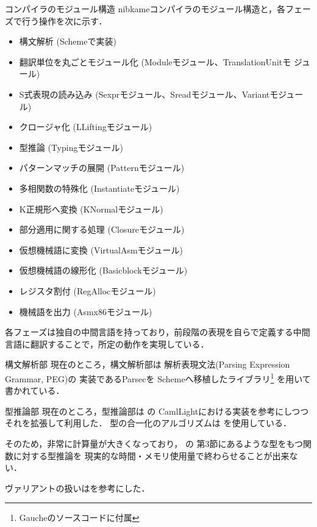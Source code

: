 \documentclass[a4paper,titlepage,report]{jsbook}
\begin{document}
\begin{resbonsiblesection}{コンパイラのモジュール構造}{\kobori}
nibkameコンパイラのモジュール構造と，各フェーズで行う操作を次に示す．

\begin{itemize}
 \item 構文解析 (Schemeで実装)
 \item 翻訳単位を丸ごとモジュール化 (Moduleモジュール、TranslationUnitモ
       ジュール)
 \item S式表現の読み込み (Sexprモジュール、Sreadモジュール、Variantモジュー
       ル)
 \item クロージャ化 (LLiftingモジュール)
 \item 型推論 (Typingモジュール)
 \item パターンマッチの展開 (Patternモジュール)
 \item 多相関数の特殊化 (Instantiateモジュール)
 \item K正規形へ変換 (KNormalモジュール)
 \item 部分適用に関する処理 (Closureモジュール)
 \item 仮想機械語に変換 (VirtualAsmモジュール)
 \item 仮想機械語の線形化 (Basicblockモジュール)
 \item レジスタ割付 (RegAllocモジュール)
 \item 機械語を出力 (Asmx86モジュール)
\end{itemize}

各フェーズは独自の中間言語を持っており，前段階の表現を自らで定義する中間
言語に翻訳することで，所定の動作を実現している．
\end{resbonsiblesection}

\begin{resbonsiblesection}{構文解析部}{\sakamoto}\label{sc:impl-parsing}
現在のところ，構文解析部は
解析表現文法(Parsing Expression Grammar, PEG)\cite{Ford:2004:PEG:982962.964011}の
実装であるParsec\cite{Hutton96monadicparser}を
Schemeへ移植したライブラリ\footnote{Gaucheのソースコードに付属}
を用いて書かれている．
\end{resbonsiblesection}

\begin{resbonsiblesection}{型推論部}{\sakamoto}\label{sc:impl-type-inference}
現在のところ，型推論部は
\algorithmW\cite{Milner1978348}\cite{Damas:1982:PTF:582153.582176}の
CamlLightにおける実装\cite{Lee:1998:PFL:291891.291892}を参考にしつつ
それを拡張して利用した．
型の合一化のアルゴリズムは
\algorithmU\cite{DBLP:books/el/RV01/BaaderS01}
を使用している．

そのため，非常に計算量が大きくなっており，
\cite{DBLP:journals/jfp/HengleinM94}の
第3節にあるような型をもつ関数に対する型推論を
現実的な時間・メモリ使用量で終わらせることが出来ない．

ヴァリアントの扱いは\cite{DBLP:conf/ctcs/Hagino87}を参考にした．
\end{resbonsiblesection}
\end{document}
